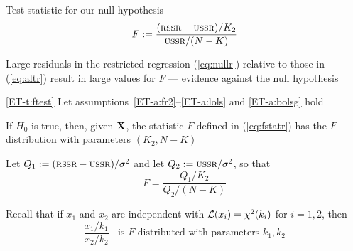 \begin{frame}

    \vspace{2em}
    Test statistic for our null hypothesis
    \begin{equation}
        \label{eq:fstatr}
        F := \frac{(\textrm{{\sc rssr}} - \textrm{{\sc ussr}}) / K_2}{ \textrm{{\sc ussr}} / (N - K)}
    \end{equation}
    
    \vspace{.7em}
    Large residuals in the restricted regression
    (\ref{eq:nullr}) relative to those in (\ref{eq:altr}) result in large
    values for $F$ --- evidence against the null hypothesis
    
    \vspace{.7em}
    \Thm
    \eqref{ET-t:ftest}
    Let assumptions~\ref{ET-a:fr2}--\ref{ET-a:lols} and \ref{ET-a:bolsg} hold
    
    If $H_0$ is true,
    then, given $\mathbf X$, the statistic $F$ defined in {\rm
    (\ref{eq:fstatr})} has the $F$ distribution with parameters $(K_2, N - K)$
    
\end{frame}

\begin{frame}

    \vspace{2em}
    \Prf
    
    Let $Q_1 := (\textrm{{\sc rssr}} - \textrm{{\sc ussr}})/ \sigma^2$ and let $Q_2 := \textrm{{\sc ussr}}/\sigma^2$, so
    that 
    \begin{equation*}
        F = \frac{Q_1 / K_2}{ Q_2 / (N - K)}
    \end{equation*}
    
    \vspace{2em}
    Recall that if $x_1$ and $x_2$ are independent with $\mathcal L(x_i) = \chi^2(k_i)$ for
    $i=1,2$, then 
    \begin{equation*}
        \frac{x_1 / k_1}{x_2 / k_2} 
        \;\;
        \text{ is $F$ distributed with parameters } k_1, k_2
    \end{equation*}
    
\end{frame}



